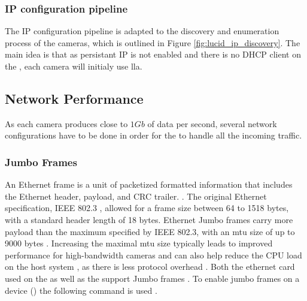 \subsubsection{IP configuration pipeline}
The IP configuration pipeline is adapted to the discovery and enumeration process of the \lucid cameras, which is outlined in Figure \ref{fig:lucid_ip_discovery}.
The main idea is that as persistant IP is not enabled and there is no DHCP client on the \jx, each camera will initialy use \gls{lla}.



\subsection{Network Performance}
As each camera produces close to $1Gb$ of data per second, several network configurations have to be done in order for the \jx to handle all the incoming traffic.

\subsubsection{Jumbo Frames}
An Ethernet frame is a unit of packetized formatted information that includes the Ethernet header, payload, and CRC trailer. \cite{winterCisco3ComApplied2009}.
The original Ethernet specification, IEEE 802.3 \cite{ieeeIEEEStandardsInterpretation2002}, allowed for a frame size between 64 to 1518 bytes, with a standard header length of 18 bytes.
Ethernet Jumbo frames carry more payload than the maximum specified by IEEE 802.3, with an \gls{mtu} size of up to 9000 bytes \cite{lucidvisionlabsJumboFramesLUCID2020}.
Increasing the maximal \gls{mtu} size typically leads to improved performance for high-bandwidth cameras and can also help reduce the CPU load on the host system \cite{lucidvisionlabsJumboFramesLUCID2020}, as there is less protocol overhead \cite{lukeThingsYouShould2018}.
Both the ethernet card used on the \jx as well as the \cams support Jumbo frames \cite{IntelI350am4Chipa} \cite{TritonMPPolarized2020a}. To enable jumbo frames on a device () the following command is used .

